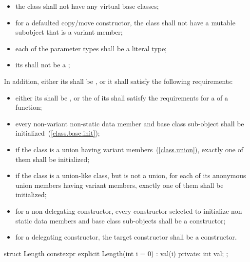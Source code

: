 \begin{itemize}
\item
the class shall not have any virtual base classes;

\item
for a defaulted copy/move constructor, the class shall not have a
mutable subobject that is a variant member;

\item
each of the parameter types shall be a literal type;

\item
its  shall not be a ;
\end{itemize}

In addition, either its  shall be
, or it shall satisfy the following requirements:

\begin{itemize}
\item
either its  shall be , or the  of its 
shall satisfy the requirements for a  of a
 function;

\item
every non-variant non-static data member and base class sub-object
shall be initialized~(\ref{class.base.init});

\item
if the class is a union having variant members~(\ref{class.union}), exactly one of them
shall be initialized;

\item
if the class is a union-like class, but is not a union, for each of its anonymous union
members having variant members, exactly one of them shall be initialized;

\item
for a non-delegating constructor, every constructor selected to initialize non-static
data members and base class sub-objects shall be a  constructor;

\item
for a delegating constructor, the target constructor shall be a 
constructor.
\end{itemize}

\begin{example}
\begin{codeblock}
struct Length { 
  constexpr explicit Length(int i = 0) : val(i) { }
private: 
  int val; 
}; 
\end{codeblock}
\end{example}

